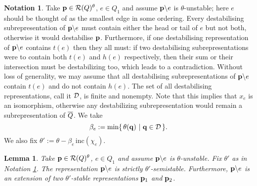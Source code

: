 \documentclass{amsart}
\newtheorem{lem}[thm]{Lemma}
\theoremstyle{definition}
\newtheorem{notn}[thm]{Notation}
\begin{document}
\begin{notn}\label{notn:theta'}
Take $\mathbf{p} \in \mathcal{R}(Q)^\theta$, $e\in Q_1$ and assume $\mathbf{p} \backslash e$ is $\theta$-unstable; here $e$ should be thought of as the smallest edge in some ordering.
Every destabilising subrepresentation of $\mathbf{p} \backslash e$ must contain either the head or tail of $e$ but not both, otherwise it would destabilise $\mathbf{p}$.
Furthermore, if one destabilising representation of $\mathbf{p} \backslash e$ contains $t(e)$ then they all must: if two destabilising subrepresentations were to contain both $t(e)$ and $h(e)$ respectively, then their sum or their intersection must be destabilizing too, which leads to a contradiction.
Without loss of generality, we may assume that all destabilising subrepresentations of $\mathbf{p} \backslash e$ contain $t(e)$ and do not contain $h(e)$.
The set of all destabilising representations, call it $\mathcal{D}$, is finite and nonempty. Note that this implies that $x_e$ is an isomorphism, otherwise any destabilizing subrepresentation would remain a subrepresentation of ${\overline{Q}}$.
We take $$\beta_e := \text{min}\{\,\theta(\mathbf{q}) \,\,|\,\, \mathbf{q} \in \mathcal{D} \,\}.$$ 
We also fix $\theta':= \theta - \beta_e \,\text{inc}(\chi_e)$.
\end{notn}


\begin{lem}\label{lm:sstabledecomp}
Take $\mathbf{p} \in \mathcal{R}(Q)^\theta$, $e\in Q_1$ and assume $\mathbf{p} \backslash e$ is $\theta$-unstable.
Fix $\theta'$ as in Notation \ref{notn:theta'}.
The representation $\mathbf{p} \backslash e$ is strictly $\theta'$-semistable.
Furthermore, $\mathbf{p} \backslash e$ is an extension of two $\theta'$-stable representations $\mathbf{p}_1$ and $\mathbf{p}_2$.


\end{lem}
\end{document}
